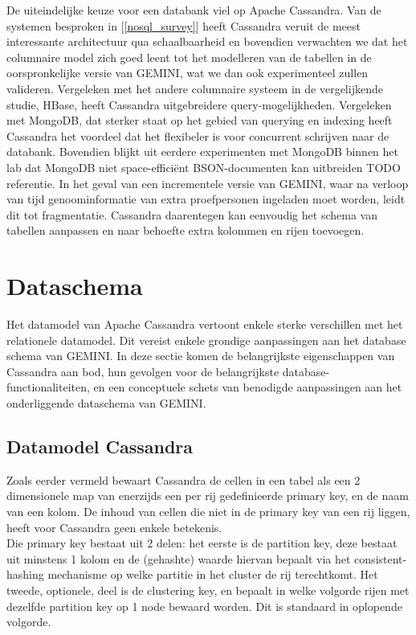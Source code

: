 De uiteindelijke keuze voor een databank viel op Apache Cassandra. Van de systemen besproken in [\ref{nosql_survey}] heeft Cassandra veruit de meest interessante architectuur qua schaalbaarheid en bovendien verwachten we dat het columnaire model zich goed leent tot het modelleren van de tabellen in de oorspronkelijke versie van GEMINI, wat we dan ook experimenteel zullen valideren. Vergeleken met het andere columnaire systeem in de vergelijkende studie, HBase, heeft Cassandra uitgebreidere query-mogelijkheden. Vergeleken met MongoDB, dat sterker staat op het gebied van querying en indexing heeft Cassandra het voordeel dat het flexibeler is voor concurrent schrijven naar de databank. Bovendien blijkt uit eerdere experimenten met MongoDB binnen het lab dat MongoDB niet space-effici\"ent BSON-documenten kan uitbreiden {\color{red} TODO referentie}. %
In het geval van een incrementele versie van GEMINI, waar na verloop van tijd genoominformatie van extra proefpersonen ingeladen moet worden, leidt dit tot fragmentatie. Cassandra daarentegen kan eenvoudig het schema van tabellen aanpassen en naar behoefte extra kolommen en rijen toevoegen. %

\section{Dataschema}

\label{cassandra_datamodel}

Het datamodel van Apache Cassandra vertoont enkele sterke verschillen met het relationele datamodel. Dit vereist enkele grondige aanpassingen aan het database schema van GEMINI. In deze sectie komen de belangrijkste eigenschappen van Cassandra aan bod, hun gevolgen voor de belangrijkste database-functionaliteiten, en een conceptuele schets van benodigde aanpassingen aan het onderliggende dataschema van GEMINI.

\subsection{Datamodel Cassandra}

Zoals eerder vermeld bewaart Cassandra de cellen in een tabel als een 2 dimensionele map van enerzijds een per rij gedefinieerde primary key, en de naam van een kolom. De inhoud van cellen die niet in de primary key van een rij liggen, heeft voor Cassandra geen enkele betekenis.\\
Die primary key bestaat uit 2 delen: het eerste is de partition key, deze bestaat uit minstens 1 kolom en de (gehashte) waarde hiervan bepaalt via het consistent-hashing mechanisme op welke partitie in het cluster de rij terechtkomt. Het tweede, optionele, deel is de clustering key, en bepaalt in welke volgorde rijen met dezelfde partition key op 1 node bewaard worden. Dit is standaard in oplopende volgorde.\\

